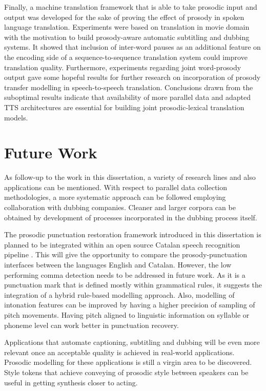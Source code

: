 Finally, a machine translation framework that is able to take prosodic input and output was developed for the sake of proving the effect of prosody in spoken language translation. Experiments were based on translation in movie domain with the motivation to build prosody-aware automatic subtitling and dubbing systems. It showed that inclusion of inter-word pauses as an additional feature on the encoding side of a sequence-to-sequence translation system could improve translation quality. Furthermore, experiments regarding joint word-prosody output gave some hopeful results for further research on incorporation of prosody transfer modelling in speech-to-speech translation. Conclusions drawn from the suboptimal results indicate that availability of more parallel data and adapted TTS architectures are essential for building joint prosodic-lexical translation models. 

\section{Future Work}
\label{conclusions:future}

As follow-up to the work in this dissertation, a variety of research lines and also applications can be mentioned. With respect to parallel data collection methodologies, a more systematic approach can be followed employing collaboration with dubbing companies. Cleaner and larger corpora can be obtained by development of processes incorporated in the dubbing process itself. 

The prosodic punctuation restoration framework introduced in this dissertation is planned to be integrated within an open source Catalan speech recognition pipeline \citep{Kulebi2018}. This will give the opportunity to compare the prosody-punctuation interfaces between the languages English and Catalan. However, the low performing comma detection needs to be addressed in future work. As it is a punctuation mark that is defined mostly within grammatical rules, it suggests the integration of a hybrid rule-based modelling approach. Also, modelling of intonation features can be improved by having a higher precision of sampling of pitch movements. Having pitch aligned to linguistic information on syllable or phoneme level can work better in punctuation recovery. 

Applications that automate captioning, subtitling and dubbing will be even more relevant once an acceptable quality is achieved in real-world applications. Prosodic modelling for these applications is still a virgin area to be discovered. Style tokens \citep{style_tokens} that achieve conveying of prosodic style between speakers can be useful in getting synthesis closer to acting. 

